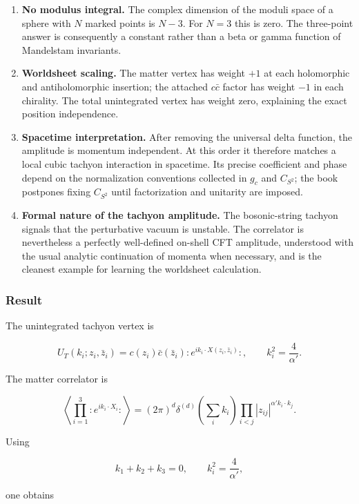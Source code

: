 \documentclass[
  10pt,
  a4paper,
  openany]{book}
\begin{document}
\begin{enumerate}
\def\labelenumi{\arabic{enumi}.}
\setcounter{enumi}{1}
\item
  \textbf{No modulus integral.} The complex dimension of the moduli
  space of a sphere with \(N\) marked points is \(N-3\). For \(N=3\)
  this is zero. The three-point answer is consequently a constant rather
  than a beta or gamma function of Mandelstam invariants.
\item
  \textbf{Worldsheet scaling.} The matter vertex has weight \(+1\) at
  each holomorphic and antiholomorphic insertion; the attached
  \(c\bar c\) factor has weight \(-1\) in each chirality. The total
  unintegrated vertex has weight zero, explaining the exact position
  independence.
\item
  \textbf{Spacetime interpretation.} After removing the universal delta
  function, the amplitude is momentum independent. At this order it
  therefore matches a local cubic tachyon interaction in spacetime. Its
  precise coefficient and phase depend on the normalization conventions
  collected in \(g_c\) and \(C_{S^2}\); the book postpones fixing
  \(C_{S^2}\) until factorization and unitarity are imposed.
\item
  \textbf{Formal nature of the tachyon amplitude.} The bosonic-string
  tachyon signals that the perturbative vacuum is unstable. The
  correlator is nevertheless a perfectly well-defined on-shell CFT
  amplitude, understood with the usual analytic continuation of momenta
  when necessary, and is the cleanest example for learning the
  worldsheet calculation.
\end{enumerate}

\subsubsection{Result}\label{result-31}

The unintegrated tachyon vertex is

\[
U_T(k_i;z_i,\bar z_i)
=c(z_i)\bar c(\bar z_i):e^{ik_i\cdot X(z_i,\bar z_i)}:,
\qquad
k_i^2=\frac4{\alpha'}.
\]

The matter correlator is

\[
\left\langle\prod_{i=1}^3:e^{ik_i\cdot X_i}:\right\rangle
=(2\pi)^d\delta^{(d)}\!\left(\sum_i k_i\right)
\prod_{i<j}|z_{ij}|^{\alpha'k_i\cdot k_j}.
\]

Using

\[
k_1+k_2+k_3=0,
\qquad
k_i^2=\frac4{\alpha'},
\]

one obtains
\end{document}
